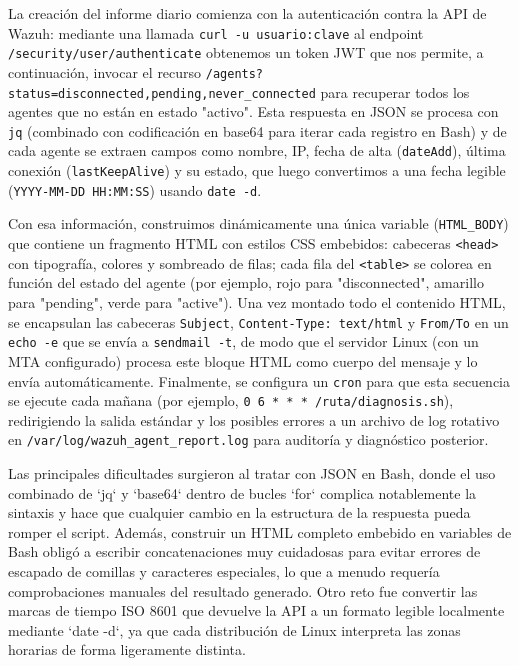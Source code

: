 La creación del informe diario comienza con la autenticación contra la API de Wazuh: mediante una llamada \texttt{curl -u usuario:clave} al endpoint \texttt{/security/user/authenticate} obtenemos un token JWT que nos permite, a continuación, invocar el recurso \texttt{/agents?status=disconnected,pending,never\_connected} para recuperar todos los agentes que no están en estado "activo". Esta respuesta en JSON se procesa con \texttt{jq} (combinado con codificación en base64 para iterar cada registro en Bash) y de cada agente se extraen campos como nombre, IP, fecha de alta (\texttt{dateAdd}), última conexión (\texttt{lastKeepAlive}) y su estado, que luego convertimos a una fecha legible (\texttt{YYYY-MM-DD HH:MM:SS}) usando \texttt{date -d}.

Con esa información, construimos dinámicamente una única variable (\texttt{HTML\_BODY}) que contiene un fragmento HTML con estilos CSS embebidos: cabeceras \texttt{<head>} con tipografía, colores y sombreado de filas; cada fila del \texttt{<table>} se colorea en función del estado del agente (por ejemplo, rojo para "disconnected", amarillo para "pending", verde para "active"). Una vez montado todo el contenido HTML, se encapsulan las cabeceras \texttt{Subject}, \texttt{Content-Type: text/html} y \texttt{From/To} en un \texttt{echo -e} que se envía a \texttt{sendmail -t}, de modo que el servidor Linux (con un MTA configurado) procesa este bloque HTML como cuerpo del mensaje y lo envía automáticamente. Finalmente, se configura un \texttt{cron} para que esta secuencia se ejecute cada mañana (por ejemplo, \texttt{0 6 * * * /ruta/diagnosis.sh}), redirigiendo la salida estándar y los posibles errores a un archivo de log rotativo en \texttt{/var/log/wazuh\_agent\_report.log} para auditoría y diagnóstico posterior.  

Las principales dificultades surgieron al tratar con JSON en Bash, donde el uso combinado de `jq` y `base64` dentro de bucles `for` complica notablemente la sintaxis y hace que cualquier cambio en la estructura de la respuesta pueda romper el script. Además, construir un HTML completo embebido en variables de Bash obligó a escribir concatenaciones muy cuidadosas para evitar errores de escapado de comillas y caracteres especiales, lo que a menudo requería comprobaciones manuales del resultado generado. Otro reto fue convertir las marcas de tiempo ISO 8601 que devuelve la API a un formato legible localmente mediante `date -d`, ya que cada distribución de Linux interpreta las zonas horarias de forma ligeramente distinta.

